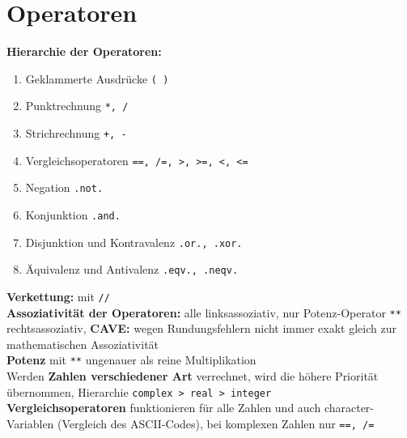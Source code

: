 \documentclass[a4paper, twocolumn]{scrarticle}
\begin{document}
\section{Operatoren}
\textbf{Hierarchie der Operatoren:}
\begin{enumerate}
  \item Geklammerte Ausdrücke \lstinline|( )|
  \item Punktrechnung \lstinline|*, /|
  \item Strichrechnung \lstinline|+, -|
  \item Vergleichsoperatoren \lstinline[style=neutral]|==, /=, >, >=, <, <=|
  \item Negation \lstinline|.not.|
  \item Konjunktion \lstinline|.and.|
  \item Disjunktion und Kontravalenz \lstinline|.or., .xor.|
  \item Äquivalenz und Antivalenz \lstinline|.eqv., .neqv.|
\end{enumerate}
\textbf{Verkettung:} mit \lstinline|//|\\
\textbf{Assoziativität der Operatoren:} alle linksassoziativ, nur Potenz-Operator \lstinline|**| rechtsassoziativ, \textbf{CAVE:} wegen Rundungsfehlern nicht immer exakt gleich zur mathematischen Assoziativität\\
\textbf{Potenz} mit \lstinline|**| ungenauer als reine Multiplikation\\
Werden \textbf{Zahlen verschiedener Art} verrechnet, wird die höhere Priorität übernommen, Hierarchie \lstinline|complex > real > integer|\\
\textbf{Vergleichsoperatoren} funktionieren für alle Zahlen und auch character-Variablen (Vergleich des ASCII-Codes), bei komplexen Zahlen nur \lstinline|==, /=|
\end{document}
